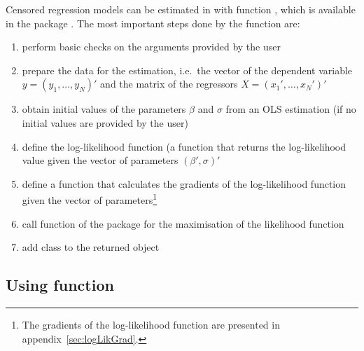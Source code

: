 \documentclass[article,nojss]{jss}
\begin{document}
Censored regression models can be estimated in 
with function ,
which is available in the  package
\citep{toomet08}.
The most important steps done by the  function are:
\begin{enumerate}
\item perform basic checks on the arguments provided by the user
\item prepare the data for the estimation,
   i.e.\ the vector of the dependent variable $y = ( y_1 , \ldots , y_N )'$
   and the matrix of the regressors $X = ( x_1 ' , \ldots , x_N ' )'$
\item obtain initial values of the parameters $\beta$ and $\sigma$
   from an OLS estimation
   (if no initial values are provided by the user)
\item define the log-likelihood function
   (a function that returns the log-likelihood value
   given the vector of parameters $( \beta' , \sigma )'$
\item define a function that calculates the gradients
   of the log-likelihood function given the vector of parameters\footnote{
      The gradients of the log-likelihood function are presented
      in appendix~\ref{sec:logLikGrad}.}
\item call function  of the  package
   \citep{r-maxlik-0.7} for the maximisation of the likelihood function
\item add class  to the returned object
\end{enumerate}


\subsection[Using function tobit]{Using function }
\end{document}
